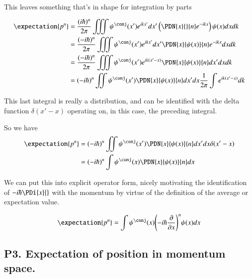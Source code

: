 \documentclass{article}
\begin{document}
This leaves something that's in shape for integration by parts

\begin{align*}
\expectation{p^n} 
&= \frac{(i\hbar)^n}{2\pi} \iiint \psi^\conj(x') e^{ikx'} dx' \left( \PDN{x}{}{n}e^{-i k x} \right) \psi(x) dx dk \\
&= \frac{(-i\hbar)^n}{2\pi} \iiint \psi^\conj(x') e^{ikx'} dx' \PDN{x}{\psi(x)}{n} e^{-i k x} dx dk \\
&= \frac{(-i\hbar)^n}{2\pi} \iiint \psi^\conj(x') e^{ik(x'-x)} \PDN{x}{\psi(x)}{n} dx' dx dk \\
&= {(-i\hbar)^n}{} \iint \psi^\conj(x') \PDN{x}{\psi(x)}{n} dx' dx \inv{2\pi}\int e^{ik(x'-x)} dk \\
\end{align*}

This last integral is really a distribution, and can be identified with the delta function $\delta(x'-x)$ operating on, in this case, the preceding integral.
%


So we have
\begin{align*}
\expectation{p^n} 
&= {(-i\hbar)^n}{} \iint \psi^\conj(x') \PDN{x}{\psi(x)}{n} dx' dx \delta(x'-x) \\
&= {(-i\hbar)^n}{} \int \psi^\conj(x) \PDN{x}{\psi(x)}{n} dx \\
\end{align*}

We can put this into explicit operator form, nicely motivating the identification of $-i\hbar \PDi{x}{}$ with the momentum by virtue 
of the definition of the average or expectation value.

\begin{align*}
\expectation{p^n} 
&= \int \psi^\conj(x) {\left( -i \hbar \PD{x}{} \right)}^n {\psi(x)} dx \\
\end{align*}

\subsection{P3.  Expectation of position in momentum space. }
\end{document}
